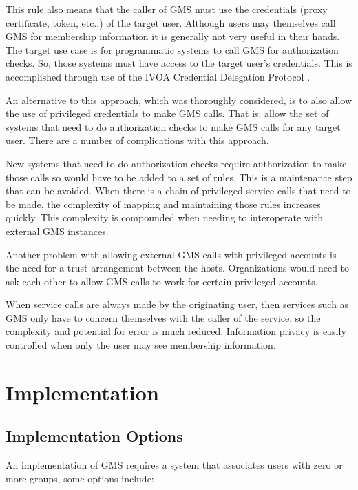 \documentclass[11pt,a4paper]{ivoa}
\begin{document}
This rule also means that the caller of GMS must use the credentials (proxy certificate, token, etc..) of the target user.  Although users may themselves call GMS for membership information it is generally not very useful in their hands.  The target use case is for programmatic systems to call GMS for authorization checks.  So, those systems must have access to the target user's credentials.  This is accomplished through use of the IVOA Credential Delegation Protocol \citep{2010ivoa.spec.0218P}.

An alternative to this approach, which was thoroughly considered, is to also allow the use of privileged credentials to make GMS calls.  That is: allow the set of systems that need to do authorization checks to make GMS calls for any target user.  There are a number of complications with this approach.

New systems that need to do authorization checks require authorization to make those calls so would have to be added to a set of rules.  This is a maintenance step that can be avoided.  When there is a chain of privileged service calls that need to be made, the complexity of mapping and maintaining those rules increases quickly.  This complexity is compounded when needing to interoperate with external GMS instances.

Another problem with allowing external GMS calls with privileged accounts is the need for a trust arrangement between the hosts.  Organizations would need to ask each other to allow GMS calls to work for certain privileged accounts.

When service calls are always made by the originating user, then services such as GMS only have to concern themselves with the caller of the service, so the complexity and potential for error is much reduced.  Information privacy is easily controlled when only the user may see membership information.

\section {Implementation}

\subsection {Implementation Options}
\label{subsec:implopts}

An implementation of GMS requires a system that associates users with zero or more groups, some options include:
\end{document}
